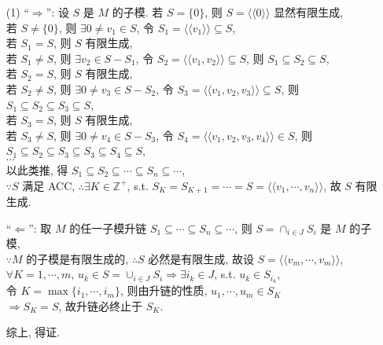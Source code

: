 \documentclass{note}
\begin{document}
\begin{pf}
    \begin{itemize}
        \item[(1)] ``$\Longrightarrow$'': 设 $S$ 是 $M$ 的子模.
        若 $S=\{0\}$, 则 $S=\langle\langle 0\rangle\rangle$ 显然有限生成,\\
        若 $S\neq\{0\}$, 则 $\exists 0\neq v_1\in S$, 令 $S_1=\langle\langle v_1\rangle\rangle\subseteq S$,\\
        若 $S_1=S$, 则 $S$ 有限生成,\\
        若 $S_1\neq S$, 则 $\exists v_2\in S-S_1$, 令 $S_2=\langle\langle v_1,v_2\rangle\rangle\subseteq S$, 则 $S_1\subseteq S_2\subseteq S$,\\
        若 $S_2=S$, 则 $S$ 有限生成,\\
        若 $S_2\neq S$, 则 $\exists 0\neq v_3\in S-S_2$, 令 $S_3=\langle\langle v_1,v_2,v_3\rangle\rangle\subseteq S$, 则 $S_1\subseteq S_2\subseteq S_3\subseteq S$,\\
        若 $S_3=S$, 则 $S$ 有限生成,\\
        若 $S_3\neq S$, 则 $\exists 0\neq v_4\in S-S_3$, 令 $S_4=\langle\langle v_1,v_2,v_3,v_4\rangle\rangle\in S$, 则 $S_1\subseteq S_2\subseteq S_3\subseteq S_3\subseteq S_4\subseteq S$,\\
        $\cdots$\\
        以此类推, 得 $S_1\subseteq S_2\subseteq\cdots\subseteq S_n\subseteq\cdots$,\\
        $\because S$ 满足 ACC, $\therefore\exists K\in\mathbb{Z}^+$, s.t. $S_K=S_{K+1}=\cdots=S=\langle\langle v_1,\cdots,v_n\rangle\rangle$, 故 $S$ 有限生成.

        ``$\Longleftarrow$'': 取 $M$ 的任一子模升链 $S_1\subseteq\cdots\subseteq S_n\subseteq\cdots$, 则 $S=\cap_{i\in J}S_i$ 是 $M$ 的子模,\\
        $\because M$ 的子模是有限生成的, $\therefore S$ 必然是有限生成, 故设 $S=\langle\langle v_m,\cdots,v_m\rangle\rangle$,\\
        $\forall K=1,\cdots,m$, $u_k\in S=\cup_{i\in J}S_i\Longrightarrow\exists i_k\in J$, s.t. $u_k\in S_{i_k}$,\\
        令 $K=\max\{i_1,\cdots,i_m\}$, 则由升链的性质, $u_1,\cdots,u_m\in S_K$\\
        $\Longrightarrow S_K=S$, 故升链必终止于 $S_K$.

        综上, 得证.
    \end{itemize}
\end{pf}
\end{document}

